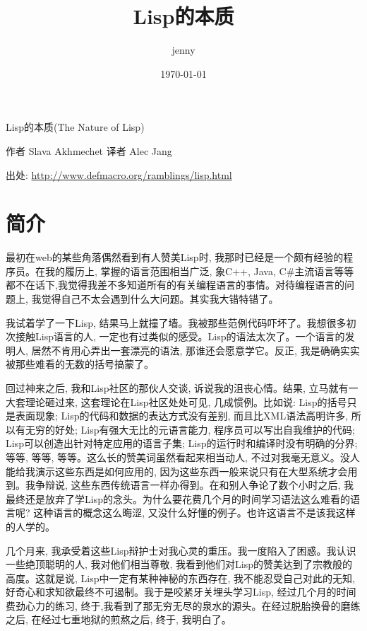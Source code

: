 \documentclass[10pt]{article}
\author{jenny}
\date{\today}
\title{Lisp的本质}
\begin{document}
\maketitle
\tableofcontents



\lstset{language=c++,
numbers=left, 
numberstyle=\tiny,
basicstyle=\ttfamily\small,
tabsize=4,
frame=none, 
escapeinside=``, 
extendedchars=false
}


Lisp的本质(The Nature of Lisp)

作者 Slava Akhmechet
译者 Alec Jang

出处: \url{http://www.defmacro.org/ramblings/lisp.html}


\section{简介}
\label{sec-1}

最初在web的某些角落偶然看到有人赞美Lisp时, 我那时已经是一个颇有经验的程序员。在我的履历上, 掌握的语言范围相当广泛, 象C++, Java, C\#主流语言等等都不在话下,我觉得我差不多知道所有的有关编程语言的事情。对待编程语言的问题上, 我觉得自己不太会遇到什么大问题。其实我大错特错了。

我试着学了一下Lisp, 结果马上就撞了墙。我被那些范例代码吓坏了。我想很多初次接触Lisp语言的人, 一定也有过类似的感受。Lisp的语法太次了。一个语言的发明人, 居然不肯用心弄出一套漂亮的语法, 那谁还会愿意学它。反正, 我是确确实实被那些难看的无数的括号搞蒙了。

回过神来之后, 我和Lisp社区的那伙人交谈, 诉说我的沮丧心情。结果, 立马就有一大套理论砸过来, 这套理论在Lisp社区处处可见, 几成惯例。比如说: Lisp的括号只是表面现象; Lisp的代码和数据的表达方式没有差别, 而且比XML语法高明许多, 所以有无穷的好处; Lisp有强大无比的元语言能力, 程序员可以写出自我维护的代码; Lisp可以创造出针对特定应用的语言子集; Lisp的运行时和编译时没有明确的分界; 等等, 等等, 等等。这么长的赞美词虽然看起来相当动人, 不过对我毫无意义。没人能给我演示这些东西是如何应用的, 因为这些东西一般来说只有在大型系统才会用到。我争辩说, 这些东西传统语言一样办得到。在和别人争论了数个小时之后, 我最终还是放弃了学Lisp的念头。为什么要花费几个月的时间学习语法这么难看的语言呢? 这种语言的概念这么晦涩, 又没什么好懂的例子。也许这语言不是该我这样的人学的。

几个月来, 我承受着这些Lisp辩护士对我心灵的重压。我一度陷入了困惑。我认识一些绝顶聪明的人, 我对他们相当尊敬, 我看到他们对Lisp的赞美达到了宗教般的高度。这就是说, Lisp中一定有某种神秘的东西存在, 我不能忍受自己对此的无知, 好奇心和求知欲最终不可遏制。我于是咬紧牙关埋头学习Lisp, 经过几个月的时间费劲心力的练习, 终于,我看到了那无穷无尽的泉水的源头。在经过脱胎换骨的磨练之后, 在经过七重地狱的煎熬之后, 终于, 我明白了。
\end{document}
